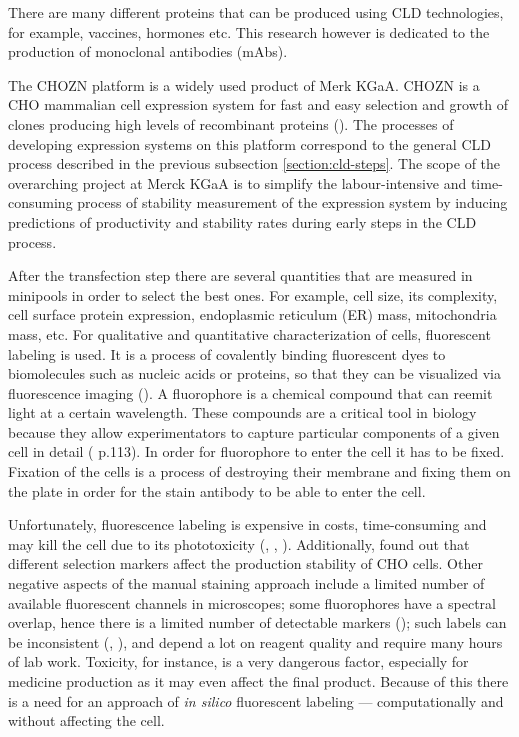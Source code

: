 There are many different proteins that can be produced using CLD technologies, for example, vaccines, hormones etc. This research however is dedicated to the production of monoclonal antibodies (mAbs). 

The CHOZN\raisebox{1ex}{\small{\textregistered}} platform is a widely used product of Merk KGaA. CHOZN\raisebox{1ex}{\small{\textregistered}} is a CHO mammalian cell expression system for fast and easy selection and growth of clones producing high levels of recombinant proteins (\cite{chozn}). The processes of developing expression systems on this platform correspond to the general CLD process described in the previous subsection \ref{section:cld-steps}. The scope of the overarching project at Merck KGaA is to simplify the labour-intensive and time-consuming process of stability measurement of the expression system by inducing predictions of productivity and stability rates during early steps in the CLD process. 

After the transfection step there are several quantities that are measured in minipools in order to select the best ones. For example, cell size, its complexity, cell surface protein expression, endoplasmic reticulum (ER) mass, mitochondria mass, etc. For qualitative and quantitative characterization of cells, fluorescent labeling is used. It is a process of covalently binding fluorescent dyes to biomolecules such as nucleic acids or proteins, so that they can be visualized via fluorescence imaging (\cite{fluorescent_labeling}). A fluorophore is a chemical compound that can reemit light at a certain wavelength. These compounds are a critical tool in biology because they allow experimentators to capture particular components of a given cell in detail (\cite{DL_for_LS} p.113). In order for fluorophore to enter the cell it has to be fixed. Fixation of the cells is a process of destroying their membrane and fixing them on the plate in order for the stain antibody to be able to enter the cell.

Unfortunately, fluorescence labeling is expensive in costs, time-consuming and may kill the cell due to its phototoxicity (\cite{Fried_1982}, \cite{Patil_2018}, \cite{Progatzky_2013}). Additionally, \cite{Yeo_2017} found out that different selection markers affect the production stability of CHO cells. Other negative aspects of the manual staining approach include a limited number of available fluorescent channels in microscopes; some fluorophores have a spectral overlap, hence there is a limited number of detectable markers (\cite{Perfetto_2004}); such labels can be inconsistent (\cite{Burry_2011}, \cite{Weigert_1970}), and depend a lot on reagent quality and require many hours of lab work. Toxicity, for instance, is a very dangerous factor, especially for medicine production as it may even affect the final product. Because of this there is a need for an approach of \textit{in silico} fluorescent labeling --- computationally and without affecting the cell. 

